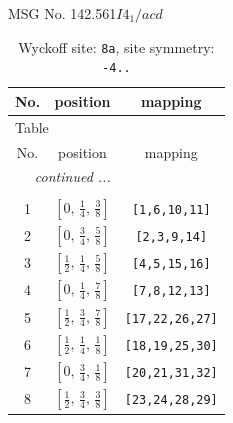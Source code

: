 \documentclass[fleqn,8pt]{jsarticle}
\begin{document}
\setcounter{MaxMatrixCols}{32}

\renewcommand{\tablename}{Table~}
\renewcommand{\figurename}{Figure~}
\begin{center}
\LARGE
MSG No. 142.561\quad$I4_{1}/acd$
\end{center}
\renewcommand{\arraystretch}{1.2}
\begin{longtable}{ccc}
\caption{Wyckoff site: {\tt 8a}, site symmetry: {\tt -4..}}
 \\
 \hline \hline
No. & position & mapping \\ \hline \endfirsthead

\multicolumn{2}{l}{\tablename\ \thetable{}} \\
 \hline \hline
No. & position & mapping \\ \hline \endhead

 \hline \hline
\multicolumn{2}{r}{\footnotesize\it continued ...} \\ \endfoot

 \hline \hline
\multicolumn{2}{r}{} \\ \endlastfoot

1 & $\left[ 0,\, \frac{1}{4},\, \frac{3}{8} \right]$ & {\tt [1,6,10,11]} \\ \hline
2 & $\left[ 0,\, \frac{3}{4},\, \frac{5}{8} \right]$ & {\tt [2,3,9,14]} \\ \hline
3 & $\left[ \frac{1}{2},\, \frac{1}{4},\, \frac{5}{8} \right]$ & {\tt [4,5,15,16]} \\ \hline
4 & $\left[ 0,\, \frac{1}{4},\, \frac{7}{8} \right]$ & {\tt [7,8,12,13]} \\ \hline
5 & $\left[ \frac{1}{2},\, \frac{3}{4},\, \frac{7}{8} \right]$ & {\tt [17,22,26,27]} \\ \hline
6 & $\left[ \frac{1}{2},\, \frac{1}{4},\, \frac{1}{8} \right]$ & {\tt [18,19,25,30]} \\ \hline
7 & $\left[ 0,\, \frac{3}{4},\, \frac{1}{8} \right]$ & {\tt [20,21,31,32]} \\ \hline
8 & $\left[ \frac{1}{2},\, \frac{3}{4},\, \frac{3}{8} \right]$ & {\tt [23,24,28,29]} \\
\end{longtable}
\renewcommand{\arraystretch}{1.2}
\end{document}
